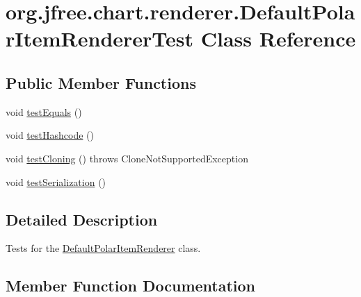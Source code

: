 \hypertarget{classorg_1_1jfree_1_1chart_1_1renderer_1_1_default_polar_item_renderer_test}{}\section{org.\+jfree.\+chart.\+renderer.\+Default\+Polar\+Item\+Renderer\+Test Class Reference}
\label{classorg_1_1jfree_1_1chart_1_1renderer_1_1_default_polar_item_renderer_test}
\subsection*{Public Member Functions}
\begin{DoxyCompactItemize}
\item 
void \mbox{\hyperlink{classorg_1_1jfree_1_1chart_1_1renderer_1_1_default_polar_item_renderer_test_a6901d8c5d4cb61180d71c18b1c4afa75}{test\+Equals}} ()
\item 
void \mbox{\hyperlink{classorg_1_1jfree_1_1chart_1_1renderer_1_1_default_polar_item_renderer_test_a1d04e87a9a28bf01eb0e3f5abc2c14d1}{test\+Hashcode}} ()
\item 
void \mbox{\hyperlink{classorg_1_1jfree_1_1chart_1_1renderer_1_1_default_polar_item_renderer_test_ace3fb1cfc1c35efa0efe412693cc9da2}{test\+Cloning}} ()  throws Clone\+Not\+Supported\+Exception 
\item 
void \mbox{\hyperlink{classorg_1_1jfree_1_1chart_1_1renderer_1_1_default_polar_item_renderer_test_a44c57be6967823043edf1f8cf7dce1f2}{test\+Serialization}} ()
\end{DoxyCompactItemize}


\subsection{Detailed Description}
Tests for the \mbox{\hyperlink{classorg_1_1jfree_1_1chart_1_1renderer_1_1_default_polar_item_renderer}{Default\+Polar\+Item\+Renderer}} class. 

\subsection{Member Function Documentation}
\mbox{\label{classorg_1_1jfree_1_1chart_1_1renderer_1_1_default_polar_item_renderer_test_ace3fb1cfc1c35efa0efe412693cc9da2}} 
